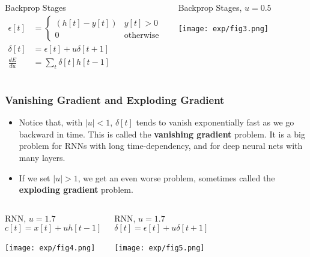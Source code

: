 \documentclass{beamer}
\begin{document}
\begin{frame}
  \begin{columns}
    \column{2.2in}
    \begin{block}{Backprop Stages}
      \begin{align*}
        \epsilon[t] &=
        \left\{\begin{array}{ll} (h[t]-y[t]) & y[t]>0\\0&\mbox{otherwise}\end{array}\right.\\
        \delta[t] &= \epsilon[t]+u\delta[t+1]\\
        \frac{dE}{du}&=\sum_t \delta[t]h[t-1]
      \end{align*}
    \end{block}
    \column{2.5in}
    \begin{block}{Backprop Stages, $u=0.5$}
      \centerline{\texttt{[image: exp/fig3.png]}}
    \end{block}
    \end{columns}
\end{frame}

\begin{frame}
  \frametitle{Vanishing Gradient and Exploding Gradient}
  \begin{itemize}
    \item Notice that, with $|u|<1$, $\delta[t]$ tends to vanish
      exponentially fast as we go backward in time.  This is called
      the {\bf vanishing gradient} problem.  It is a big problem for
      RNNs with long time-dependency, and for deep neural nets with
      many layers.
    \item If we set $|u|>1$, we get an even worse problem, sometimes
      called the {\bf exploding gradient} problem.
  \end{itemize}
\end{frame}
        
\begin{frame}
  \begin{columns}
    \column{2.25in}
    \begin{block}{RNN, $u=1.7$}
      \[
      c[t] = x[t]+uh[t-1]
      \]
      \centerline{\texttt{[image: exp/fig4.png]}}
    \end{block}
    \column{2.25in}
    \begin{block}{RNN, $u=1.7$}
      \[
      \delta[t]=\epsilon[t]+u\delta[t+1]
      \]
      \centerline{\texttt{[image: exp/fig5.png]}}
    \end{block}
    \end{columns}
\end{frame}
\end{document}
